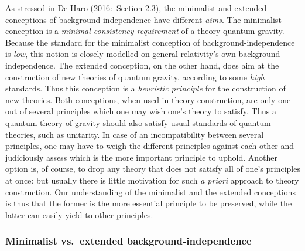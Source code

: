 \documentclass[12pt]{article}
\renewcommand{\^}[1]{\hat{#1}}
\begin{document}
As stressed in De Haro (2016:~Section 2.3), the minimalist and extended conceptions of background-independence have different {\it aims}. The minimalist conception is a {\it minimal consistency requirement} of a theory quantum gravity. Because the standard for the minimalist conception of background-independence is {\it low}, this notion is closely modelled on general relativity's own background-independence. The extended conception, on the other hand, does aim at the construction of new theories of quantum gravity, according to some {\it high} standards. Thus this conception is a {\it heuristic principle} for the construction of new theories. Both conceptions, when used in theory construction, are only one out of several principles which one may wish one's theory to satisfy. Thus a quantum theory of gravity should also satisfy usual standards of quantum theories, such as unitarity. In case of an incompatibility between several principles, one may have to weigh the different principles against each other and judiciously assess which is the more important principle to uphold. Another option is, of course, to drop any theory that does not satisfy all of one's principles at once: but usually there is little motivation for such {\it a priori} approach to theory construction. Our understanding of the minimalist and the extended conceptions is thus that the former is the more essential principle to be preserved, while the latter can easily yield to other principles.

\subsubsection{Minimalist vs.~extended background-independence}
\end{document}
